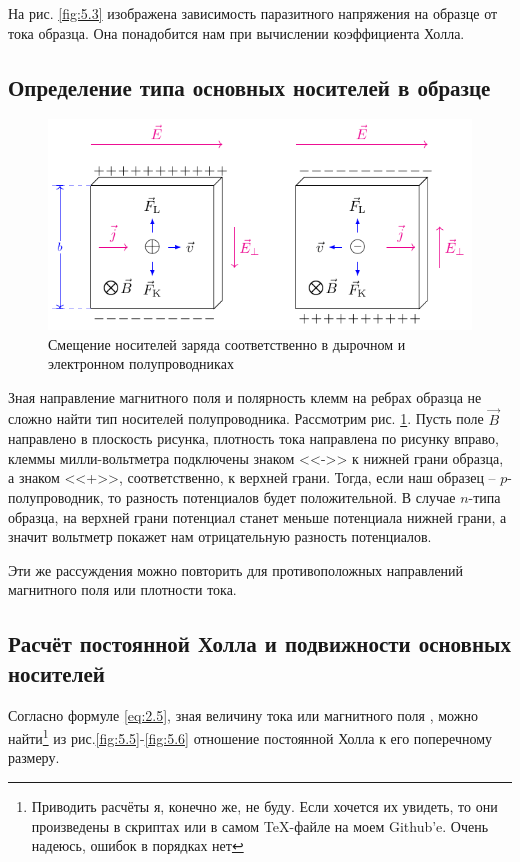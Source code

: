 На рис. \ref{fig:5.3} изображена зависимость паразитного напряжения на образце от тока образца. Она понадобится нам при вычислении коэффициента Холла. 




\subsection{Определение типа основных носителей в образце}

\begin{figure}[H]
	\centering
	\includegraphics[width=\linewidth]{fig/effect.pdf}
	\caption{Смещение носителей заряда соответственно в дырочном и электронном полупроводниках \cite{lit0}}
	\label{fig:hall}
\end{figure}

Зная направление магнитного поля и полярность клемм на ребрах образца не сложно найти тип носителей полупроводника. Рассмотрим рис. \ref{fig:hall}. Пусть поле $\vec B$ направлено в плоскость рисунка, плотность тока направлена по рисунку вправо, клеммы милли-вольтметра подключены знаком <<->> к нижней грани образца, а знаком <<+>>, соответственно, к верхней грани. Тогда, если наш образец -- $p$- полупроводник, то разность потенциалов будет положительной. В случае $n$-типа образца, на верхней грани потенциал станет меньше потенциала нижней грани, а значит вольтметр покажет нам отрицательную разность потенциалов.

Эти же рассуждения можно повторить для противоположных направлений магнитного поля или плотности тока.


\subsection{Расчёт постоянной Холла и подвижности основных носителей}
Согласно формуле \eqref{eq:2.5}, зная величину тока или магнитного поля , можно найти\footnote{Приводить расчёты я, конечно же, не буду. Если хочется их увидеть, то они произведены в скриптах  или в самом \TeX-файле на моем Github'e. Очень надеюсь, ошибок в порядках нет} из рис.\ref{fig:5.5}-\ref{fig:5.6} отношение постоянной Холла к его поперечному размеру.

